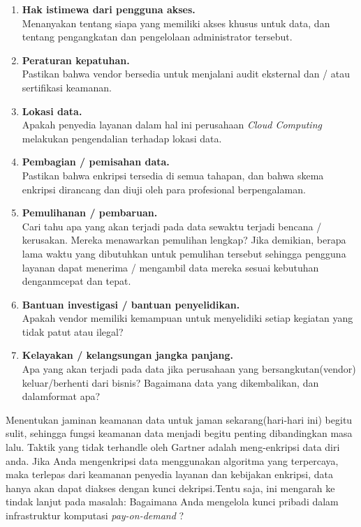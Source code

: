 \begin{enumerate}
\item \textbf{Hak istimewa dari pengguna akses.}\\
Menanyakan tentang siapa yang memiliki akses khusus untuk data, dan tentang pengangkatan dan pengelolaan administrator tersebut.
\item \textbf{Peraturan kepatuhan.}\\
Pastikan bahwa vendor bersedia untuk menjalani audit eksternal dan / atau sertifikasi keamanan.
\item \textbf{Lokasi data.}\\
Apakah   penyedia   layanan   dalam   hal   ini   perusahaan   \textit{Cloud  Computing} melakukan pengendalian terhadap lokasi data.
\item \textbf{Pembagian / pemisahan data.}\\
Pastikan bahwa enkripsi tersedia di semua tahapan, dan bahwa skema enkripsi dirancang dan diuji  oleh para profesional berpengalaman.
\item \textbf{Pemulihanan / pembaruan.}\\
Cari tahu apa yang akan terjadi pada data sewaktu terjadi bencana / kerusakan. Mereka menawarkan pemulihan lengkap? Jika demikian, berapa lama waktu yang dibutuhkan untuk pemulihan tersebut sehingga pengguna layanan dapat menerima / mengambil data mereka sesuai kebutuhan denganmcepat dan tepat.
\item \textbf{Bantuan investigasi / bantuan penyelidikan.}\\
Apakah vendor memiliki kemampuan untuk menyelidiki setiap kegiatan  yang  tidak  patut atau ilegal?
\item \textbf{Kelayakan / kelangsungan jangka panjang.}\\
Apa yang akan terjadi pada data jika perusahaan yang bersangkutan(vendor) keluar/berhenti  dari bisnis? Bagaimana data yang dikembalikan, dan dalamformat apa?
\end{enumerate}
Menentukan jaminan keamanan data untuk jaman sekarang(hari-hari ini) begitu sulit, sehingga fungsi keamanan data menjadi begitu penting dibandingkan masa lalu. Taktik yang tidak terhandle oleh Gartner adalah meng-enkripsi data diri anda. Jika Anda mengenkripsi data menggunakan algoritma yang terpercaya, maka terlepas dari keamanan penyedia layanan dan kebijakan enkripsi, data hanya akan dapat diakses dengan kunci dekripsi.Tentu saja, ini mengarah ke tindak lanjut pada masalah: Bagaimana Anda mengelola kunci pribadi dalam infrastruktur komputasi  \textit{pay-on-demand} ?\\\\
